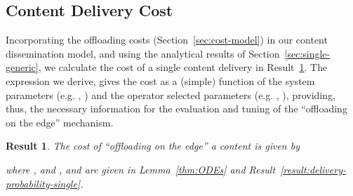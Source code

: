 \documentclass[10pt,conference,letterpaper]{IEEEtran}
\newtheorem{result}{Result}
\begin{document}
\subsection{Content Delivery Cost}\label{sec:analysis-cost}
Incorporating the offloading costs (Section~\ref{sec:cost-model}) in our content dissemination model, and using the analytical results of Section~\ref{sec:single-generic}, we calculate the cost of a single content delivery in Result~\ref{thm:lemma-single-cost}. The expression we derive, gives the cost as a (simple) function of the system parameters (e.g. , ) and the operator selected parameters (e.g. , ), providing, thus, the necessary information for the evaluation and tuning of the ``offloading on the edge'' mechanism.

\begin{result}\label{thm:lemma-single-cost}
The cost of ``offloading on the edge'' a content is given by

where , and ,  and  are given in Lemma~\ref{thm:ODEs} and Result~\ref{result:delivery-probability-single}.
\end{result}
\end{document}
